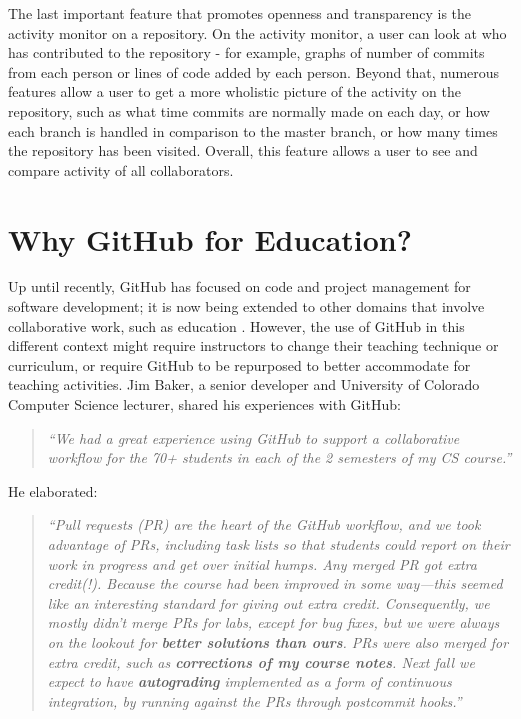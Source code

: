 The last important feature that promotes openness and transparency is the activity monitor on a repository. On the activity monitor, a user can look at who has contributed to the repository - for example, graphs of number of commits from each person or lines of code added by each person. Beyond that, numerous features allow a user to get a more wholistic picture of the activity on the repository, such as what time commits are normally made on each day, or how each branch is handled in comparison to the master branch, or how many times the repository has been visited. Overall, this feature allows a user to see and compare activity of all collaborators.

\section{Why GitHub for Education?}
Up until recently, GitHub has focused on code and project management for software development; it is now being extended to other domains that involve collaborative work, such as education \cite{Griffin:2013:GCJ:2458539.2458551}. However, the use of GitHub in this different context might require instructors to change their teaching technique or curriculum, or require GitHub to be repurposed to better accommodate for teaching activities. Jim Baker, a senior developer and University of Colorado Computer Science lecturer, shared his experiences with GitHub: \begin{quote}\textit{``We had a great experience using GitHub to support a collaborative workflow for the 70+ students in each of the 2 semesters of my CS course.''}\end{quote} He elaborated: \begin{quote}\textit{``Pull requests (PR) are the heart of the GitHub workflow, and we took advantage of PRs, including task lists so that students could report on their work in progress and get over initial humps. Any merged PR got extra credit(!). Because the course had been improved in some way---this seemed like an interesting standard for giving out extra credit. Consequently, we mostly didn't merge PRs for labs, except for bug fixes, but we were always on the lookout for \textbf{better solutions than ours}. PRs were also merged for extra credit, such as \textbf{corrections of my course notes}. Next fall we expect to have \textbf{autograding} implemented as a form of continuous integration, by running against the PRs through postcommit hooks.''}\end{quote}

